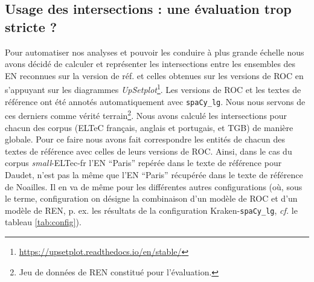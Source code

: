 \subsection{Usage des intersections : une évaluation trop stricte ?}
\label{subsec:inter_OCR-IMPACT-NER}
Pour automatiser nos analyses et pouvoir les conduire à plus grande échelle nous avons décidé de calculer et représenter les intersections entre les ensembles des EN reconnues sur la version de réf. et celles obtenues sur les versions de ROC en s'appuyant sur les diagrammes \textit{UpSetplot}\footnote{\url{https://upsetplot.readthedocs.io/en/stable/}}. Les versions de ROC et les textes de référence ont été annotés automatiquement avec \texttt{spaCy\_lg}. Nous nous servons de ces derniers comme vérité terrain\footnote{Jeu de données de REN constitué pour l'évaluation.}. Nous avons calculé les intersections pour chacun des corpus (ELTeC français, anglais et portugais, et TGB) de manière globale. 
Pour ce faire nous avons fait correspondre les entités de chacun des textes de référence avec celles de leurs versions de ROC. Ainsi, dans le cas du corpus \textit{small}-ELTec-fr l'EN ``Paris'' repérée dans le texte de référence pour Daudet, n'est pas la même que l'EN ``Paris'' récupérée dans le texte de référence de Noailles. Il en va de même pour les différentes autres configurations (où, sous le terme, \og{}configuration\fg{} on désigne la combinaison d'un modèle de ROC et d'un modèle de REN, p. ex. les résultats de la configuration Kraken-\texttt{spaCy\_lg}, \textit{cf.} le tableau \ref{tab:config}).

